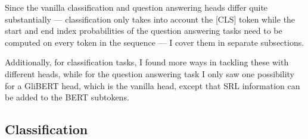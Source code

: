 Since the vanilla classification and question answering heads differ quite substantially
--- classification only takes into account the [CLS] token while the start and end index
probabilities of the question answering tasks need to be computed on every token in the
sequence --- I cover them in separate subsections.


Additionally, for classification tasks, I found more ways in tackling these
with different heads, while for the question answering task I only saw one
possibility for a GliBERT head, which is the vanilla head, except
that SRL information can be added to the BERT subtokens.

\subsection{Classification}






